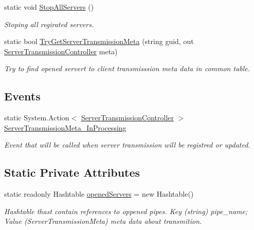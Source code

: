 \begin{DoxyCompactItemize}
static void \mbox{\hyperlink{class_pipes_provider_1_1_server_1_1_server_a_p_i_a44469667416cb072d8fd258b299a53cd}{Stop\+All\+Servers}} ()
\begin{DoxyCompactList}\small\item\em Stoping all regirated servers. \end{DoxyCompactList}\item 
static bool \mbox{\hyperlink{class_pipes_provider_1_1_server_1_1_server_a_p_i_aa6e5aaed8ff095caa67db23104e5da7a}{Try\+Get\+Server\+Transmission\+Meta}} (string guid, out \mbox{\hyperlink{class_pipes_provider_1_1_server_1_1_server_transmission_controller}{Server\+Transmission\+Controller}} meta)
\begin{DoxyCompactList}\small\item\em Try to find opened servert to client transmisssion meta data in common table. \end{DoxyCompactList}\end{DoxyCompactItemize}
\subsection*{Events}
\begin{DoxyCompactItemize}
\item 
static System.\+Action$<$ \mbox{\hyperlink{class_pipes_provider_1_1_server_1_1_server_transmission_controller}{Server\+Transmission\+Controller}} $>$ \mbox{\hyperlink{class_pipes_provider_1_1_server_1_1_server_a_p_i_a01037d62fa41e0bc31d645d3459a67a9}{Server\+Transmission\+Meta\+\_\+\+In\+Processing}}
\begin{DoxyCompactList}\small\item\em Event that will be called when server transmission will be registred or updated. \end{DoxyCompactList}\end{DoxyCompactItemize}
\subsection*{Static Private Attributes}
\begin{DoxyCompactItemize}
\item 
static readonly Hashtable \mbox{\hyperlink{class_pipes_provider_1_1_server_1_1_server_a_p_i_ac18f0fca4de6269edeb97379112e67ca}{opened\+Servers}} = new Hashtable()
\begin{DoxyCompactList}\small\item\em Hashtable thast contain references to oppened pipes. Key (string) pipe\+\_\+name; Value (Server\+Transmission\+Meta) meta data about transmition. \end{DoxyCompactList}\end{DoxyCompactItemize}


